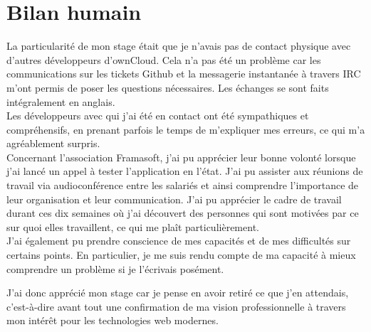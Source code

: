 \documentclass[10pt,a4paper, twoside]{report}
\begin{document}
	\section{Bilan humain}
	La particularité de mon stage était que je n'avais pas de contact physique avec d'autres développeurs d'ownCloud. Cela n'a pas été un problème car les communications sur les tickets Github et la messagerie instantanée à travers IRC m'ont permis de poser les questions nécessaires. Les échanges se sont faits intégralement en anglais.
	\\
	
	Les développeurs avec qui j'ai été en contact ont été sympathiques et compréhensifs, en prenant parfois le temps de m'expliquer mes erreurs, ce qui m'a agréablement surpris.
	\\
	
	Concernant l'association Framasoft, j'ai pu apprécier leur bonne volonté lorsque j'ai lancé un appel à tester l'application en l'état. J'ai pu assister aux réunions de travail via audioconférence entre les salariés et ainsi comprendre l'importance de leur organisation et leur communication.	
	J'ai pu apprécier le cadre de travail durant ces dix semaines où j'ai découvert des personnes qui sont motivées par ce sur quoi elles travaillent, ce qui me plaît particulièrement. 
	\\
	
	J'ai également pu prendre conscience de mes capacités et de mes difficultés sur certains points. En particulier, je me suis rendu compte de ma capacité à mieux comprendre un problème si je l'écrivais posément.
	
	J'ai donc apprécié mon stage car je pense en avoir retiré ce que j'en attendais, c'est-à-dire avant tout une confirmation de ma vision professionnelle à travers mon intérêt pour les technologies web modernes.
	
\end{document}
